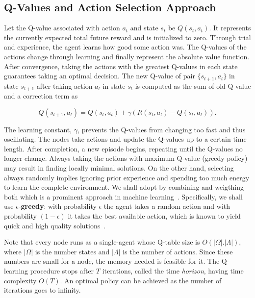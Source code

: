  
 
\subsection{ Q-Values and Action Selection Approach} 
Let the Q-value associated with action $a_t$ and state $s_t$ be $Q(s_t, a_t)$. It represents the currently expected total future reward and  is initialized to zero. 
Through trial and experience, the agent learns how good some action was. The Q-values of
the actions change through learning and finally represent the absolute value function. After
convergence, taking the actions with the greatest Q-values in each state guarantees taking an 
optimal decision. The new Q-value of pair $\{s_{t+1}, a_t\}$ in state $s_{t+1}$ after taking action $a_t$ in state $s_t$ is computed
as the sum of old Q-value and a correction term as 

$$
Q(s_{t+1}, a_t) = Q(s_t, a_t) + \gamma(R(s_t, a_t) - Q(s_t, a_t)). $$


The learning constant, $\gamma$, prevents the Q-values from changing too
fast and thus oscillating. The nodes take actions  and update the Q-values up to a certain time length.  After completion, a new episode begins, repeating until the Q-values no longer
change. Always taking the actions with maximum
Q-value (greedy policy) may result in finding locally minimal solutions. On the other
hand, selecting always randomly implies ignoring prior experience and
spending too much energy to learn the complete environment. We shall adopt by combining and weigthing both which is a prominent approach in machine learning~\cite{RLBook}. Specifically, we shall use $\epsilon$-{\bf greedy}: with probability $\epsilon$ the agent takes a random action and with
probability $(1 - \epsilon)$ it takes the best available action, which is known to yield quick and high quality solutions~\cite{RLBook}. 
  
 
 
 Note that every node runs as a single-agent whose Q-table size is $O(|\Omega | . |\Lambda|)$, where $|\Omega |$ is the number states and $|\Lambda|$ is the number of actions. Since these numbers are small for a node, the memory needed is feasible for it. The Q-learning procedure stops after $T$ iterations, called the time {\slshape horizon}, having time complexity $O(T)$. An optimal policy can be achieved as the number of iterations goes to infinity.  




 
       

          